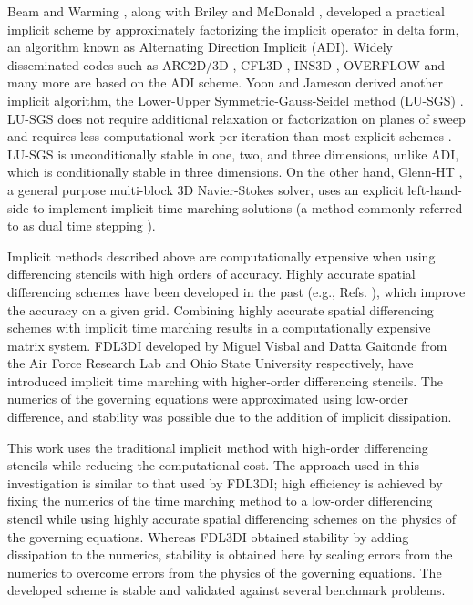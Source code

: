 \documentclass[conf]{new-aiaa}
\begin{document}
Beam and Warming \cite{Beam}, along with Briley and McDonald \cite{Briley}, developed a practical implicit scheme by approximately factorizing the implicit operator in delta form, an algorithm known as Alternating Direction Implicit (ADI). 
Widely disseminated codes such as ARC2D/3D \cite{ARC2D, ARC3D}, CFL3D \cite{CFL3D}, INS3D \cite{INS3D}, OVERFLOW \cite{OVERFLOW} and many more are based on the ADI scheme. 
Yoon and Jameson derived another implicit algorithm, the Lower-Upper Symmetric-Gauss-Seidel method (LU-SGS) \cite{LUSGS}. 
LU-SGS does not require additional relaxation or factorization on planes of sweep and requires less computational work per iteration than most explicit schemes \cite{YoonLUSGS}. 
LU-SGS is unconditionally stable in one, two, and three dimensions, unlike ADI, which is conditionally stable in three dimensions. 
On the other hand, Glenn-HT \cite{GlennHT}, a general purpose multi-block 3D Navier-Stokes solver, uses an explicit left-hand-side to implement implicit time marching solutions (a method commonly referred to as dual time stepping \cite{DualTimeStepping, Dual_Time, Sheih}). 


Implicit methods described above are computationally expensive when using differencing stencils with high orders of accuracy. 
Highly accurate spatial differencing schemes have been developed in the past (e.g., Refs. \cite{Lele2, DRP, Optimized_Compact, Prefactored, FDL3DI3, FDL3DI_C}), which improve the accuracy on a given grid. 
Combining highly accurate spatial differencing schemes with implicit time marching results in a computationally expensive matrix system. 
FDL3DI \cite{FDL3DI_A, FDL3DI_B, FDL3DI_C} developed by Miguel Visbal and Datta Gaitonde from the Air Force Research Lab and Ohio State University respectively, have introduced implicit time marching with higher-order differencing stencils. 
The numerics of the governing equations were approximated using low-order difference, and stability was possible due to the addition of implicit dissipation. 

This work uses the traditional implicit method with high-order differencing stencils while reducing the computational cost. 
The approach used in this investigation is similar to that used by FDL3DI; high efficiency is achieved by fixing the numerics of the time marching method to a low-order differencing stencil while using highly accurate spatial differencing schemes on the physics of the governing equations.
Whereas FDL3DI obtained stability by adding dissipation to the numerics, stability is obtained here by scaling errors from the numerics to overcome errors from the physics of the governing equations. 
The developed scheme is stable and validated against several benchmark problems.
 
\end{document}
